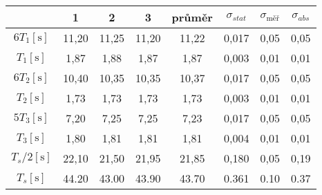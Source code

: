 \begin{tabular}{cccccccc}																														\toprule
						&	1		&	2		&	3		&	průměr	&	$\sigma_{stat}$	&	$\sigma_{\text{měř}}$	&	$\sigma_{abs}$	\\	\midrule
$6 T_1   [\si{\second}]$&	11,20	&	11,25	&	11,20	&	11,22	&	0,017			&	0,05					&	0,05			\\	
$  T_1   [\si{\second}]$&	1,87	&	1,88	&	1,87	&	1,87	&	0,003			&	0,01					&	0,01			\\	\midrule
$6 T_2   [\si{\second}]$&	10,40	&	10,35	&	10,35	&	10,37	&	0,017			&	0,05					&	0,05			\\	
$  T_2   [\si{\second}]$&	1,73	&	1,73	&	1,73	&	1,73	&	0,003			&	0,01					&	0,01			\\	\midrule
$5 T_3   [\si{\second}]$&	7,20	&	7,25	&	7,25	&	7,23	&	0,017			&	0,05					&	0,05			\\	
$  T_3   [\si{\second}]$&	1,80	&	1,81	&	1,81	&	1,81	&	0,004			&	0,01					&	0,01			\\	\midrule
$  T_s/2 [\si{\second}]$&	22,10	&	21,50	&	21,95	&	21,85	&	0,180			&	0,05					&	0,19			\\	
$  T_s   [\si{\second}]$&   44.20	&	43.00	&	43.90	&	43.70	&	0.361			&	0.10					&	0.37			\\	\bottomrule

\end{tabular}

